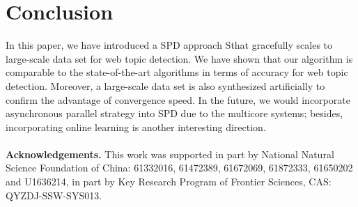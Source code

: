 \documentclass[runningheads]{llncs}
\begin{document}
\section{Conclusion}
\label{sec:conclusion}
In this paper, we have introduced a SPD approach Sthat gracefully scales to large-scale data set for web topic detection. We have shown that our algorithm is comparable to the state-of-the-art algorithms in terms of accuracy for web topic detection. Moreover, a large-scale data set is also synthesized artificially to confirm the advantage of convergence speed. In the future, we would incorporate asynchronous parallel strategy into SPD due to the multicore systems; besides, incorporating online learning is another interesting direction.
\\
\\
\textbf{Acknowledgements.} This work was supported in part by National Natural Science Foundation of China: 61332016, 61472389, 61672069, 61872333, 61650202 and U1636214, in part by Key Research Program of Frontier Sciences, CAS: QYZDJ-SSW-SYS013.


%



\end{document}
